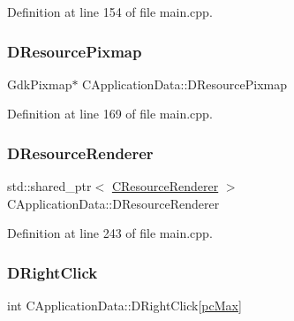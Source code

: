 Definition at line 154 of file main.\+cpp.

\hypertarget{classCApplicationData_aa9faf270fb2d769855fa5d787a883a83}{}\label{classCApplicationData_aa9faf270fb2d769855fa5d787a883a83} 
\subsubsection{\texorpdfstring{D\+Resource\+Pixmap}{DResourcePixmap}}
{\footnotesize\ttfamily Gdk\+Pixmap$\ast$ C\+Application\+Data\+::\+D\+Resource\+Pixmap\hspace{0.3cm}{\ttfamily [protected]}}



Definition at line 169 of file main.\+cpp.

\hypertarget{classCApplicationData_ac912b3f9b8e9a8c1b49eeadac315284f}{}\label{classCApplicationData_ac912b3f9b8e9a8c1b49eeadac315284f} 
\subsubsection{\texorpdfstring{D\+Resource\+Renderer}{DResourceRenderer}}
{\footnotesize\ttfamily std\+::shared\+\_\+ptr$<$ \hyperlink{classCResourceRenderer}{C\+Resource\+Renderer} $>$ C\+Application\+Data\+::\+D\+Resource\+Renderer\hspace{0.3cm}{\ttfamily [protected]}}



Definition at line 243 of file main.\+cpp.

\hypertarget{classCApplicationData_a845b854113fb8742338ada01af8b9351}{}\label{classCApplicationData_a845b854113fb8742338ada01af8b9351} 
\subsubsection{\texorpdfstring{D\+Right\+Click}{DRightClick}}
{\footnotesize\ttfamily int C\+Application\+Data\+::\+D\+Right\+Click\mbox{[}\hyperlink{GameDataTypes_8h_aafb0ca75933357ff28a6d7efbdd7602fa594a5c8dd3987f24e8a0f23f1a72cd34}{pc\+Max}\mbox{]}\hspace{0.3cm}{\ttfamily [protected]}}



